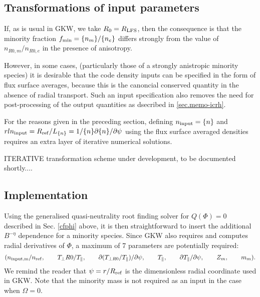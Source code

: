 \subsection{Transformations of input parameters}

If, as is usual in GKW, we take $R_0 = R_{\rm LFS}$, then the consequence is that the minority
fraction $f_{\rm min} = \{n_m\}/\{n_e\}$ differs strongly from the value of $n_{R0,m} / n_{R0,e}$ in the presence of anisotropy.

However, in some cases, (particularly those of a strongly anistropic minority species)
it is desirable that the code density inputs can be specified in the form of flux surface averages,
because this is the canoncial conserved quantity in the absence of radial transport.  Such an input specification 
also removes the need for post-processing of the output quantities as dsecribed in \ref{sec.memo-icrh}.

For the reasons given in the preceding section, defining $n_{\rm input} = \{n\}$ and $rln_{\rm input} = R_{\rm ref}/L_{\{n\}} = 1/\{n\} \partial \{n\} / \partial \psi$
using the flux surface averaged densities requires an extra layer of iterative numerical solutions.

ITERATIVE transformation scheme under development, to be documented shortly....

\subsection{Implementation}

Using the generalised quasi-neutrality root finding solver for $Q(\Phi) = 0$ described in Sec. \ref{cfphi} above, it is then straightforward to 
insert the additional $B^{-\eta}$ dependence for a minority species.  Since GKW also requires and computes radial derivatives of $\Phi$, 
a maximum of 7 parameters are potentially required: 
\begin{equation}
( n_{\rm input,m}/n_{\rm ref},\qquad {T_\perp R0}/T_\parallel,\qquad {\partial (T_{\perp R0}/T_\parallel) / \partial \psi},\qquad
 T_\parallel,\qquad  \partial T_\parallel / \partial \psi,\qquad Z_m,\qquad m_m ).
\end{equation}
We remind the reader that $\psi = r/R_{\rm ref}$ is the dimensionless radial coordinate used in GKW.  Note that the minority mass is not required as an input in the case when $\Omega = 0$.

